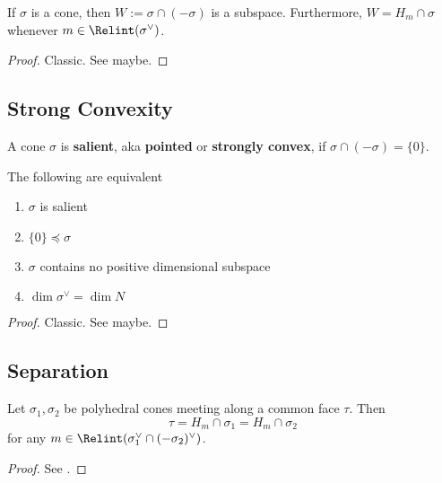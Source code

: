 \begin{lemma}
  \label{1-2-min-face}

  If $\sigma$ is a cone, then $W := \sigma \cap (-\sigma)$ is a subspace. Furthermore,
  $W = H_m \cap \sigma$ whenever $m \in \Relint(\sigma^\vee)$.
\end{lemma}
\begin{proof}
  \uses{}

  Classic. See \cite{Oda_1988} maybe.
\end{proof}


\subsection{Strong Convexity}


\begin{definition}
  \label{1-2-12-salient-cone}
  \uses{}
  \leanok

  A cone $\sigma$ is {\bf salient}, aka {\bf pointed} or {\bf strongly convex}, if $\sigma \cap (-\sigma) = \{0\}$.
\end{definition}


\begin{proposition}
  \label{1-2-12-salient-cone-tfae}

  The following are equivalent
  \begin{enumerate}
    \item $\sigma$ is salient
    \item $\{0\} \preceq \sigma$
    \item $\sigma$ contains no positive dimensional subspace
    \item $\dim \sigma^\vee = \dim N$
  \end{enumerate}
\end{proposition}
\begin{proof}
  \uses{}

  Classic. See \cite{Oda_1988} maybe.
\end{proof}


\subsection{Separation}


\begin{lemma}
  \label{1-2-13-separation-lemma}

  Let $\sigma_1, \sigma_2$ be polyhedral cones meeting along a common face $\tau$. Then
  $$\tau = H_m \cap \sigma_1 = H_m \cap \sigma_2$$
  for any $m \in \Relint(\sigma_1^\vee \cap (-\sigma_2)^\vee)$.
\end{lemma}
\begin{proof}

  See \cite{Cox_2011}.
\end{proof}



